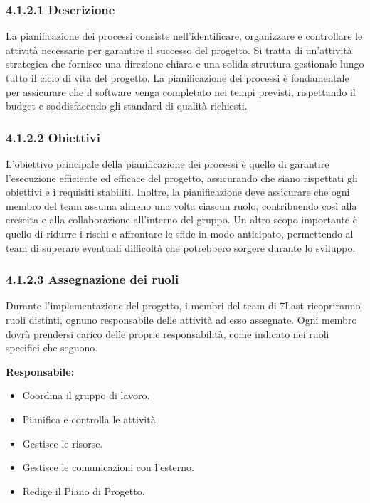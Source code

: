 \subsubsection{4.1.2.1 Descrizione}

La pianificazione dei processi consiste nell'identificare, organizzare e controllare le attività necessarie per garantire il successo del progetto. Si tratta di un'attività strategica che fornisce una direzione chiara e una solida struttura gestionale lungo tutto il ciclo di vita del progetto. La pianificazione dei processi è fondamentale per assicurare che il software venga completato nei tempi previsti, rispettando il budget e soddisfacendo gli standard di qualità richiesti.

\subsubsection{4.1.2.2 Obiettivi}

L’obiettivo principale della pianificazione dei processi è quello di garantire l'esecuzione efficiente ed efficace del progetto, assicurando che siano rispettati gli obiettivi e i requisiti stabiliti. Inoltre, la pianificazione deve assicurare che ogni membro del team assuma almeno una volta ciascun ruolo, contribuendo così alla crescita e alla collaborazione all'interno del gruppo. Un altro scopo importante è quello di ridurre i rischi e affrontare le sfide in modo anticipato, permettendo al team di superare eventuali difficoltà che potrebbero sorgere durante lo sviluppo.

\subsubsection{4.1.2.3 Assegnazione dei ruoli}

Durante l'implementazione del progetto, i membri del team di 7Last ricopriranno ruoli distinti, ognuno responsabile delle attività ad esso assegnate. Ogni membro dovrà prendersi carico delle proprie responsabilità, come indicato nei ruoli specifici che seguono.

\textbf{Responsabile:}
\begin{itemize}
    \item Coordina il gruppo di lavoro.
    \item Pianifica e controlla le attività.
    \item Gestisce le risorse.
    \item Gestisce le comunicazioni con l’esterno.
    \item Redige il Piano di Progetto.
\end{itemize}

